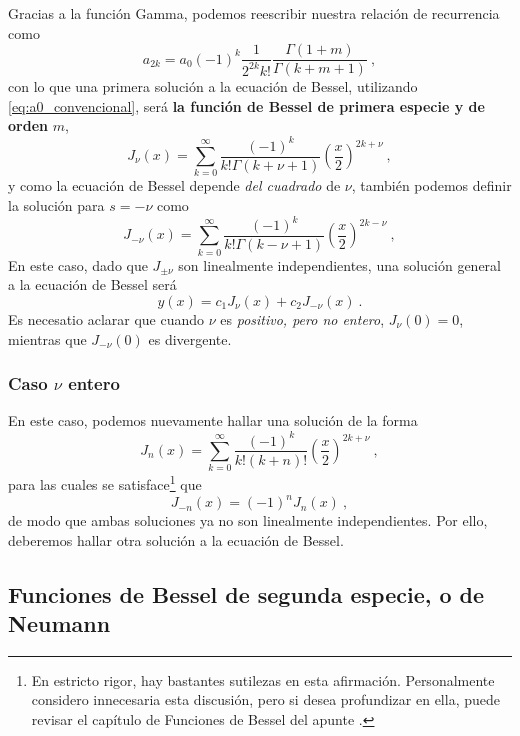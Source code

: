 Gracias a la función Gamma, podemos reescribir nuestra relación de recurrencia como
\begin{equation}
    a_{2k} = a_0 (-1)^k \frac{1}{2^{2k} k!} \frac{\Gamma(1+m)}{\Gamma(k+m+1)} \ ,
\end{equation}
con lo que una primera solución a la ecuación de Bessel, utilizando \eqref{eq:a0_convencional}, será \textbf{la función de Bessel de primera especie y de orden} $m$, 
\begin{equation}
    J_\nu (x) = \sum_{k=0}^\infty \frac{(-1)^k}{k! \Gamma(k+\nu+1)} \left(\frac{x}{2}\right)^{2k+\nu} \ ,
\end{equation}
y como la ecuación de Bessel depende \emph{del cuadrado} de $\nu$, también podemos definir la solución para $s = -\nu$ como
\begin{equation}
    J_{-\nu} (x) = \sum_{k=0}^\infty \frac{(-1)^k}{k! \Gamma(k-\nu+1)} \left(\frac{x}{2}\right)^{2k-\nu} \ ,
\end{equation}
En este caso, dado que $J_{\pm \nu}$ son linealmente independientes, una solución general a la ecuación de Bessel será
\begin{equation}
    y(x) = c_1 J_\nu(x) + c_2 J_{-\nu}(x) \ .
\end{equation}
Es necesatio aclarar que cuando $\nu$ es \emph{positivo, pero no entero}, $J_\nu(0) = 0$, mientras que $J_{-\nu}(0)$ es divergente.

\subsubsection{Caso $\nu$ entero}

En este caso, podemos nuevamente hallar una solución de la forma 
\begin{equation}
    J_n(x) = \sum_{k=0}^\infty \frac{(-1)^k}{k! (k+n)!} \left( \frac{x}{2} \right)^{2k+\nu} \ ,
\end{equation}
para las cuales se satisface\footnote{En estricto rigor, hay bastantes sutilezas en esta afirmación. Personalmente considero innecesaria esta discusión, pero si desea profundizar en ella, puede revisar el capítulo de Funciones de Bessel del apunte \cite{Rubilar}.} que
\begin{equation}
    J_{-n}(x) = (-1)^n J_n(x) \ ,
\end{equation}
de modo que ambas soluciones ya no son linealmente independientes. Por ello, deberemos hallar otra solución a la ecuación de Bessel.

\subsection{Funciones de Bessel de segunda especie, o de Neumann}


